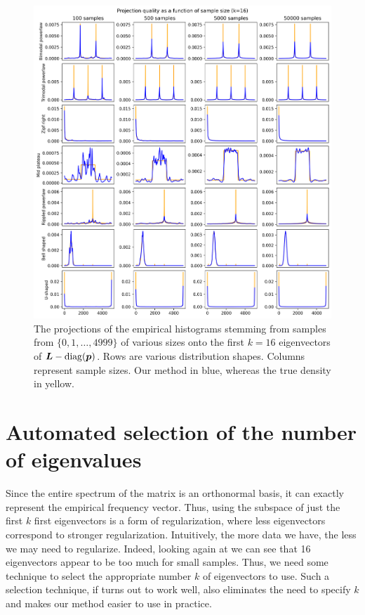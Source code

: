 \documentclass[10pt]{article} %
\DeclareMathOperator{\diag}{diag}
\begin{document}
\begin{figure}[tbh]
    \centering
    \includegraphics[width=\textwidth]{proj_diff_samples.png}
    \caption{The projections of the empirical histograms stemming from  samples from $\{0, 1, \dots, 4999\}$ of various sizes onto the first $k=16$ eigenvectors of $\mL - \diag(\vp)$. Rows are various distribution shapes. Columns represent sample sizes. Our method in blue, whereas the true density in yellow.}
    \label{fig:apx_sample_sizes}
\end{figure}

\section{Automated selection of the number of eigenvalues}
Since the entire spectrum of the matrix is an orthonormal basis, it can exactly represent the empirical frequency vector. Thus, using the subspace of just the first $k$ first eigenvectors is a form of regularization, where less eigenvectors correspond to stronger regularization. Intuitively, the more data we have, the less we may need to regularize. Indeed, looking again at  we can see that 16 eigenvectors appear to be too much for small samples. Thus, we need some technique to select the appropriate number $k$ of eigenvectors to use. Such a selection technique, if turns out to work well, also eliminates the need to specify $k$ and makes our method easier to use in practice.
\end{document}

